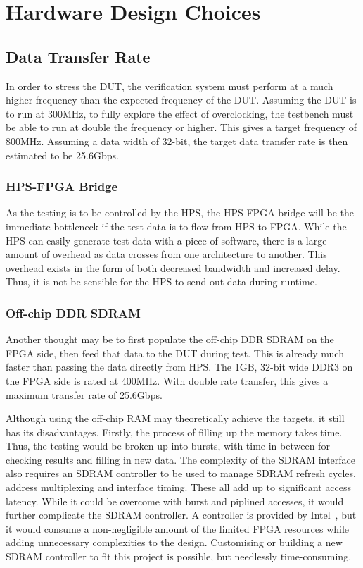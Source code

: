 \section{Hardware Design Choices}

\subsection{Data Transfer Rate}
In order to stress the DUT, the verification system must perform at a much
higher frequency than the expected frequency of the DUT.
Assuming the DUT is to run at 300MHz, to fully explore the effect of
overclocking, the testbench must be able to run at double the frequency or
higher.
This gives a target frequency of 800MHz.
Assuming a data width of 32-bit, the target data transfer rate is then 
estimated to be 25.6Gbps.

\subsubsection{\textbf{HPS-FPGA Bridge}}
As the testing is to be controlled by the HPS, the HPS-FPGA bridge will be the
immediate bottleneck if the test data is to flow from HPS to FPGA.
While the HPS can easily generate test data with a piece of software,
there is a large amount of overhead as data crosses from one architecture
to another.
This overhead exists in the form of both decreased bandwidth and increased
delay.
Thus, it is not be sensible for the HPS to send out data during runtime.

\subsubsection{\textbf{Off-chip DDR SDRAM}}
Another thought may be to first populate the off-chip DDR SDRAM on the FPGA
side, then feed that data to the DUT during test.
This is already much faster than passing the data directly from HPS.
The 1GB, 32-bit wide DDR3 on the FPGA side is rated at 400MHz.
With double rate transfer, this gives a maximum transfer rate of 25.6Gbps.

Although using the off-chip RAM may theoretically achieve the targets,
it still has its disadvantages.
Firstly, the process of filling up the memory takes time.
Thus, the testing would be broken up into bursts, with time in between for
checking results and filling in new data.
The complexity of the SDRAM interface also requires an SDRAM controller to be
used to manage SDRAM refresh cycles, address multiplexing and interface timing.
These all add up to significant access latency.
While it could be overcome with burst and piplined accesses,
it would further complicate the SDRAM controller.
A controller is provided by Intel~\cite{Altera3}, but it would consume
a non-negligible amount of the limited FPGA resources while adding
unnecessary complexities to the design.
Customising or building a new SDRAM controller to fit this project is possible,
but needlessly time-consuming.

